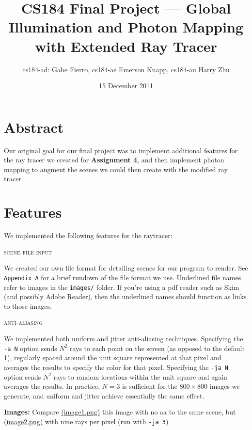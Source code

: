 \documentclass{article}
\title{CS184 Final Project --- Global Illumination and Photon Mapping with Extended Ray Tracer}
\author{cs184-ad: Gabe Fierro, cs184-ae Emerson Knapp, cs184-au Harry Zhu}
\date{15 December 2011}
\begin{document}
\maketitle

\section*{Abstract}

Our original goal for our final project was to implement additional features for the ray tracer we created for {\bf Assignment 4}, and then implement photon mapping to augment the scenes we could then create with the modified ray tracer. 

\tableofcontents

\section{Features} %
\label{sec:features}

We implemented the following features for the raytracer:

\begin{center}\textsc{scene file input}\end{center} 
We created our own file format for detailing scenes for our program to render. See \verb+Appendix A+ for a brief rundown of the file format we use. Underlined file names refer to images in the \verb+images/+ folder. If you're using a pdf reader such as Skim (and possibly Adobe Reader), then the underlined names should function as links to those images.

\begin{center}\textsc{anti-aliasing}\end{center} 
We implemented both uniform and jitter anti-aliasing techniques. Specifying the \verb+-a N+ option sends $N^2$ rays to each point on the screen (as opposed to the default 1), regularly spaced around the unit square represented at that pixel and averages the results to specify the color for that pixel. Specifying the \verb+-ja N+ option sends $N^2$ rays to random locations within the unit square and again averages the results. In practice, $N=3$ is sufficient for the $800\times 800$ images we generate, and uniform and jitter achieve essentially the same effect.

\vspace{3mm}
{\bf Images:} Compare \href{run://images/image1.png}{\underline{(image1.png)}} this image with no aa  to the same scene, but \href{run://images/image2.png}{\underline{(image2.png)}} with nine rays per pixel (run with \verb+-ja 3+)
\end{document}
